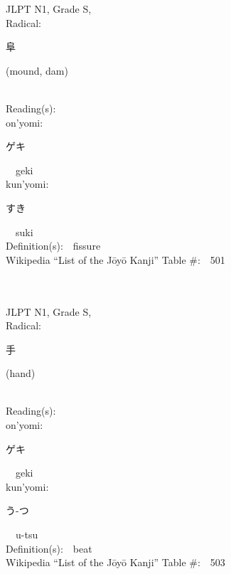 \begin{multicols}{2}
{JLPT N1, Grade S, \\Radical:\ \ {\begin{CJK}{UTF8}{min} 阜 \end{CJK}} (mound, dam) } \\
Reading(s):\ \ \\
{\hspace*{1em}}on'yomi:\ \ \\
{\hspace*{2em}}{\begin{CJK}{UTF8}{min} ゲキ \end{CJK}}\ \ geki\ \ \\
{\hspace*{1em}}kun'yomi:\ \ \\
{\hspace*{2em}}{\begin{CJK}{UTF8}{min} すき \end{CJK}}\ \ suki\ \ \\
Definition(s):\ \ fissure \\
Wikipedia ``List of the J\=oy\=o Kanji'' Table \#:\ \ 501 \\
\ \ \\
{\fontsize{34pt}{40pt}  }\ \ \\
{JLPT N1, Grade S, \\Radical:\ \ {\begin{CJK}{UTF8}{min} 手 \end{CJK}} (hand) } \\
Reading(s):\ \ \\
{\hspace*{1em}}on'yomi:\ \ \\
{\hspace*{2em}}{\begin{CJK}{UTF8}{min} ゲキ \end{CJK}}\ \ geki\ \ \\
{\hspace*{1em}}kun'yomi:\ \ \\
{\hspace*{2em}}{\begin{CJK}{UTF8}{min} う-つ \end{CJK}}\ \ u-tsu\ \ \\
Definition(s):\ \ beat \\
Wikipedia ``List of the J\=oy\=o Kanji'' Table \#:\ \ 503 \\
\ \ \\

\end{multicols}
